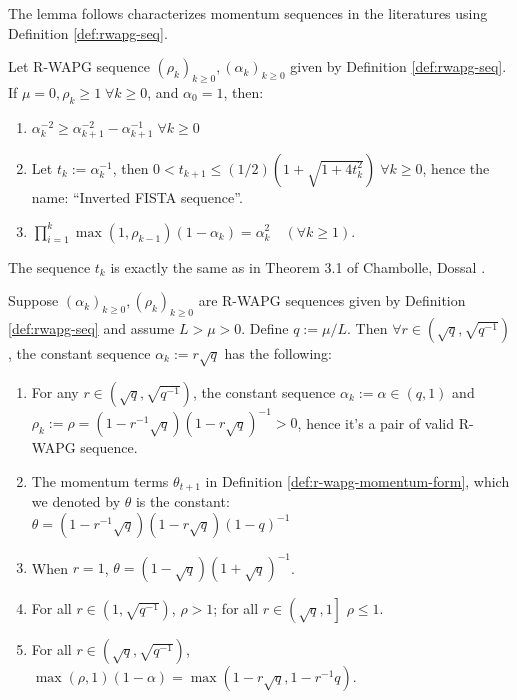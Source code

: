 \documentclass[12pt]{article}
\begin{document}
        The lemma follows characterizes momentum sequences in the literatures using Definition \ref{def:rwapg-seq}. 
        \begin{lemma}\label{lemma:inverted-fista-seq}
            Let R-WAPG sequence $(\rho_k)_{k \ge 0}, (\alpha_k)_{k \ge 0}$ given by Definition \ref{def:rwapg-seq}. 
            If $\mu = 0, \rho_k \ge 1\; \forall k \ge 0$, and $\alpha_0 = 1$, then: 
            \begin{enumerate}
                \item $\alpha_k^{-2} \ge \alpha_{k + 1}^{-2} - \alpha_{k + 1}^{-1}\; \forall k \ge 0$
                \item Let $t_k := \alpha_k^{-1}$, then $0 < t_{k + 1} \le (1/2)\left(1 + \sqrt{1 + 4t_k^2}\right)\;\forall k\ge 0$, hence the name: ``Inverted FISTA sequence''. 
                \item $\prod_{i = 1}^k\max(1, \rho_{k - 1})(1 - \alpha_k) = \alpha_k^2 \quad (\forall k \ge 1)$. 
            \end{enumerate}
        \end{lemma}
        \begin{remark}
            The sequence $t_k$ is exactly the same as in Theorem 3.1 of Chambolle, Dossal \cite{chambolle_convergence_2015}. 
        \end{remark}
        \begin{lemma}\label{lemma:constant-rwapg-seq}
            Suppose $(\alpha_k)_{k \ge 0}, (\rho_k)_{k \ge 0}$ are R-WAPG sequences given by Definition \ref{def:rwapg-seq} and assume $L > \mu > 0$.
            Define $q := \mu/L$. 
            Then $\forall r \in \left(\sqrt{q},\sqrt{q^{-1}}\right)$, the constant sequence $\alpha_k := r \sqrt{q}$ has the following: 
            \begin{enumerate}
                \item For any $r \in \left(\sqrt{q}, \sqrt{q^{-1}}\right)$, the constant sequence $\alpha_k := \alpha \in (q, 1)$ and\\
                $\rho_k := \rho=\left(1-r^{-1}\sqrt{q}\right)\left(1 - r \sqrt{q}\right)^{-1} > 0$, hence it's a pair of valid R-WAPG sequence. 
                \item The momentum terms $\theta_{t + 1}$ in Definition \ref{def:r-wapg-momentum-form}, which we denoted by $\theta$ is the constant:\\ $\theta = (1 - r^{-1}\sqrt{q})(1 - r\sqrt{q})(1- q)^{-1}$
                \item When $r = 1$, $\theta = (1- \sqrt{q})(1 + \sqrt{q})^{-1}$. 
                \item For all $r \in \left(1, \sqrt{q^{-1}}\right)$, $\rho > 1$; for all $r \in \left(\sqrt{q}, 1\right]$ $\rho \le 1$. 
                \item For all $r \in \left(\sqrt{q}, \sqrt{q^{-1}}\right)$, $\max(\rho, 1)(1 - \alpha) = \max\left(1 - r\sqrt{q}, 1 - r^{-1}q\right)$. 
            \end{enumerate}
        \end{lemma}
\end{document}
